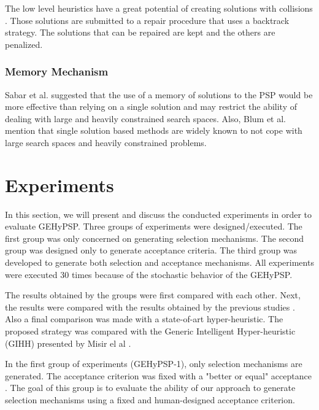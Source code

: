 \documentclass[conference]{IEEEtran}
\begin{document}
The low level heuristics have a great potential of creating solutions with collisions \cite{benitez2015algoritmo}. Those solutions are submitted to a repair procedure that uses a backtrack strategy. The solutions that can be repaired are kept and the others are penalized. 
 


\subsubsection{Memory Mechanism}
Sabar et al. \cite{sabar2015automatic} suggested that the use of a memory of solutions to the PSP would be more effective than relying on a single solution and may restrict the ability of dealing with large and heavily constrained search spaces. Also, Blum et al. \cite{blum2011hybrid} mention that single solution based methods are widely known to not cope with large search spaces and heavily constrained problems.



\section{Experiments}
\label{sec:experiments}


In this section, we will present and discuss the conducted experiments in order to evaluate GEHyPSP. Three groups of experiments were designed/executed. The first group was only concerned on generating selection mechanisms. The second group was designed only to generate acceptance criteria. The third group was developed to generate both selection and acceptance mechanisms. All experiments were executed 30 times because of the stochastic behavior of the GEHyPSP. 


The results obtained by the groups were first compared with each other. Next, the results were compared with the results obtained by the previous studies \cite{custodio2004investigation,lin2011protein,santana2008component,custodio2014multiple}. Also a final comparison was made with a state-of-art hyper-heuristic. The proposed strategy was compared with the Generic Intelligent Hyper-heuristic (GIHH) presented by Misir el al \cite{misir2012intelligent}.



In the first group of  experiments (GEHyPSP-1), only selection mechanisms are generated. The acceptance criterion was fixed with a "better or equal" acceptance \cite{burke2009exploring}. The goal of this group is to evaluate the ability of our approach to generate selection mechanisms using a fixed and human-designed acceptance criterion.   
\end{document}
